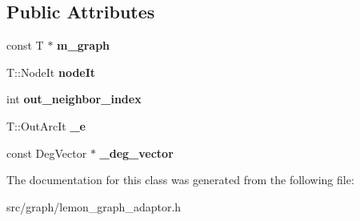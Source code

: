\subsection*{Public Attributes}
\begin{DoxyCompactItemize}
\item 
\hypertarget{classall__distance__sketch_1_1graph_1_1GenericGraphBaseAdaptor_1_1GenericIterator_a823f499579b8bc0f6da3066f6d5a8457}{}const T $\ast$ {\bfseries m\+\_\+graph}\label{classall__distance__sketch_1_1graph_1_1GenericGraphBaseAdaptor_1_1GenericIterator_a823f499579b8bc0f6da3066f6d5a8457}

\item 
\hypertarget{classall__distance__sketch_1_1graph_1_1GenericGraphBaseAdaptor_1_1GenericIterator_a47ec33a09056bc8f16d4748d2cf225be}{}T\+::\+Node\+It {\bfseries node\+It}\label{classall__distance__sketch_1_1graph_1_1GenericGraphBaseAdaptor_1_1GenericIterator_a47ec33a09056bc8f16d4748d2cf225be}

\item 
\hypertarget{classall__distance__sketch_1_1graph_1_1GenericGraphBaseAdaptor_1_1GenericIterator_a469419c56bbec03ba0e91d1f091a0013}{}int {\bfseries out\+\_\+neighbor\+\_\+index}\label{classall__distance__sketch_1_1graph_1_1GenericGraphBaseAdaptor_1_1GenericIterator_a469419c56bbec03ba0e91d1f091a0013}

\item 
\hypertarget{classall__distance__sketch_1_1graph_1_1GenericGraphBaseAdaptor_1_1GenericIterator_a36175dd4635f0f8b61115c3a35c1204d}{}T\+::\+Out\+Arc\+It {\bfseries \+\_\+e}\label{classall__distance__sketch_1_1graph_1_1GenericGraphBaseAdaptor_1_1GenericIterator_a36175dd4635f0f8b61115c3a35c1204d}

\item 
\hypertarget{classall__distance__sketch_1_1graph_1_1GenericGraphBaseAdaptor_1_1GenericIterator_a4270a10f1fd05a074b768f66ac3ea7c0}{}const Deg\+Vector $\ast$ {\bfseries \+\_\+deg\+\_\+vector}\label{classall__distance__sketch_1_1graph_1_1GenericGraphBaseAdaptor_1_1GenericIterator_a4270a10f1fd05a074b768f66ac3ea7c0}

\end{DoxyCompactItemize}


The documentation for this class was generated from the following file\+:\begin{DoxyCompactItemize}
\item 
src/graph/lemon\+\_\+graph\+\_\+adaptor.\+h\end{DoxyCompactItemize}
